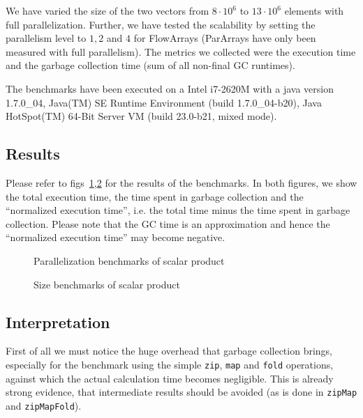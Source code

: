 \documentclass[runningheads,a4paper,fleqn]{llncs}
\begin{document}
We have varied the size of the two vectors from $8 \cdot 10^6$ to $13
\cdot 10^6$ elements with full parallelization. Further, we have
tested the scalability by setting the parallelism level to $1,2$ and
$4$ for FlowArrays (ParArrays have only been measured with full
parallelism). The metrics we collected were the execution time and the
garbage collection time (sum of all non-final GC runtimes).

The benchmarks have been executed on a Intel i7-2620M with a java
version 1.7.0\_04, Java(TM) SE Runtime Environment (build
1.7.0\_04-b20), Java HotSpot(TM) 64-Bit Server VM (build 23.0-b21,
mixed mode).

\subsection{Results}

Please refer to figs~\ref{fig:par-bench},\ref{fig:size-bench} for the
results of the benchmarks. In both figures, we show the total
execution time, the time spent in garbage collection and the
``normalized execution time'', i.e. the total time minus the time
spent in garbage collection. Please note that the GC time is an
approximation and hence the ``normalized execution time'' may become
negative.

\begin{figure}
\caption{Parallelization benchmarks of scalar product}
\label{fig:par-bench}
\end{figure}

\begin{figure}
\caption{Size benchmarks of scalar product}
\label{fig:size-bench}
\end{figure}

\subsection{Interpretation}
First of all we must notice the huge overhead that garbage collection
brings, especially for the benchmark using the simple \texttt{zip},
\texttt{map} and \texttt{fold} operations, against which the actual
calculation time becomes negligible. This 
is already strong evidence, that intermediate results should be
avoided (as is done in \texttt{zipMap} and \texttt{zipMapFold}).
\end{document}
